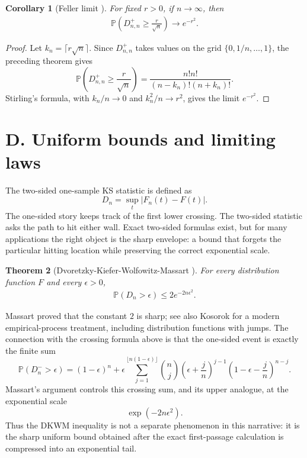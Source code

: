 \documentclass[12pt]{article}
\newtheorem{theorem}{Theorem}
\newtheorem{corollary}[theorem]{Corollary}
\theoremstyle{remark}
\begin{document}
\begin{corollary}[Feller limit \cite{feller1991introduction}]
    For fixed $r>0$, if $n\rightarrow\infty$, then
    \begin{align}
        \mathbb{P}\left(D_{n,n}^+\ge\frac{r}{\sqrt{n}}\right)\rightarrow e^{-r^2}.
    \end{align}
\end{corollary}
\begin{proof}
Let $k_n=\lceil r\sqrt n\rceil$. Since $D_{n,n}^{+}$ takes values on the grid
$\{0,1/n,\ldots,1\}$, the preceding theorem gives
\[
\mathbb{P}\left(D_{n,n}^+\ge\frac{r}{\sqrt n}\right)
=\frac{n!n!}{(n-k_n)!(n+k_n)!}.
\]
Stirling's formula, with $k_n/n\to0$ and $k_n^2/n\to r^2$, gives the limit
$e^{-r^2}$.
\end{proof}


\section*{D. Uniform bounds and limiting laws}
The two-sided one-sample KS statistic is defined as
\[
D_n=\sup_t|F_n(t)-F(t)|.
\]
The one-sided story keeps track of the first lower crossing. The two-sided
statistic asks the path to hit either wall. Exact two-sided formulas exist, but
for many applications the right object is the sharp envelope: a bound that
forgets the particular hitting location while preserving the correct exponential
scale.

\begin{theorem}[Dvoretzky-Kiefer-Wolfowitz-Massart \cite{dvoretzky1956asymptotic,massart1990tight}]
For every distribution function $F$ and every $\epsilon>0$,
\begin{align}
    \mathbb{P}\left(D_n>\epsilon\right)\le 2e^{-2n\epsilon^2}.
\end{align}
\end{theorem}

Massart \cite{massart1990tight} proved that the constant $2$ is sharp; see
also Kosorok \cite{kosorok2008introduction} for a modern empirical-process
treatment, including distribution functions with jumps. The connection with
the crossing formula above is that the one-sided event is exactly the finite
sum
\[
    \mathbb{P}(D_n^->\epsilon)
    =(1-\epsilon)^n+\epsilon\sum_{j=1}^{\lfloor n(1-\epsilon)\rfloor}
    \binom{n}{j}
    \left(\epsilon+\frac{j}{n}\right)^{j-1}
    \left(1-\epsilon-\frac{j}{n}\right)^{n-j}.
\]
Massart's argument controls this crossing sum, and its upper analogue, at the
exponential scale
\[
  \exp(-2n\epsilon^2).
\]
Thus the DKWM inequality is not a separate phenomenon in this narrative: it is
the sharp uniform bound obtained after the exact first-passage calculation is
compressed into an exponential tail.
\end{document}
